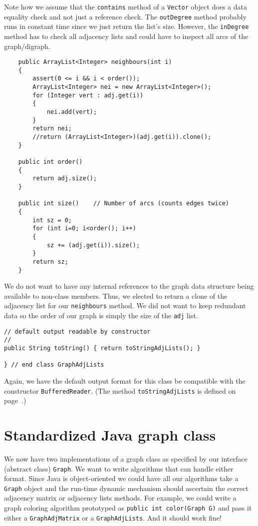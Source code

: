 Note how we assume that the \verb|contains| method of a \verb|Vector|
object does a data equality check and not just a reference check. The
\verb|outDegree| method probably runs in constant time since we just
return the list's size.   However, the \verb|inDegree| method has to
check all adjacency lists and could have to inspect  all arcs of the
graph/digraph.


{\renewcommand{\ttdefault}{pcr} %
\footnotesize%
\begin{verbatim}
    public ArrayList<Integer> neighbours(int i)
    {
        assert(0 <= i && i < order());
        ArrayList<Integer> nei = new ArrayList<Integer>();
        for (Integer vert : adj.get(i))
        {
            nei.add(vert);
        }
        return nei;
        //return (ArrayList<Integer>)(adj.get(i)).clone();
    }

    public int order()
    {
        return adj.size();
    }

    public int size()    // Number of arcs (counts edges twice)
    {
        int sz = 0;
        for (int i=0; i<order(); i++)
        {
            sz += (adj.get(i)).size();
        }
        return sz;
    }
\end{verbatim}%
}

We do not want to have any internal references to the graph data structure
being available to non-class members.   Thus, we elected to return a clone
of the adjacency list for our \verb|neighbours| method. We did not want to
keep redundant data so the order of our graph is simply the size of the
\verb|adj| list. 

{\renewcommand{\ttdefault}{pcr} %
\footnotesize \begin{verbatim}
// default output readable by constructor
//
public String toString() { return toStringAdjLists(); }

} // end class GraphAdjLists
\end{verbatim}%
}

Again, we have the default output format for this class be compatible 
with the constructor \verb|BufferedReader|.
(The method \verb|toStringAdjLists| is defined on
page~\pageref{graphoutput}.)

\section{Standardized Java graph class}

We now have two implementations of a graph class as
specified by our interface (abstract class) \verb|Graph|.  We want to write 
algorithms that can handle either format.  Since Java is object-oriented
we could have all our algorithms take a \verb|Graph| object and
the run-time dynamic mechanism should ascertain the correct adjacency
matrix or adjacency lists methods.
For example, we could write a graph coloring algorithm prototyped
as \verb|public int color(Graph G)|  and pass it
either a \verb|GraphAdjMatrix| or a \verb|GraphAdjLists|.
And it should work fine!\\ 

